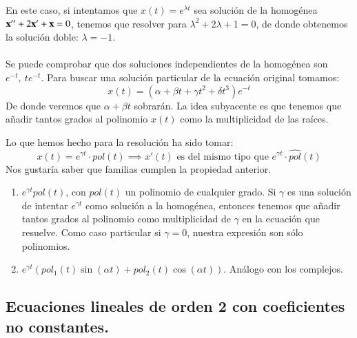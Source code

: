 \begin{eg}[Ecuación lineal de orden 2: $\mbf{x}''+3\mbf{x}'+\mbf{x}=te^{-t}$]
    En este caso, si intentamos que $x(t) = e^{\lambda t}$ sea solución de la homogénea $\mathbf{x}'' + 2\mathbf{x}' + \mathbf{x} = 0$, tenemos que resolver para $\lambda^2 + 2\lambda + 1 = 0$, de donde obtenemos la solución doble: $\lambda = -1$.\\\\
    Se puede comprobar que dos soluciones independientes de la homogénea son $e^{-t},\ te^{-t}$. Para buscar una solución particular de la ecuación original tomamos:
    $$
        x(t) = (\alpha + \beta t + \gamma t^2 + \delta t^3) e^{-t}
    $$
    De donde veremos que $\alpha + \beta t$ sobrarán. La idea subyacente es que tenemos que añadir tantos grados al polinomio $x(t)$ como la multiplicidad de las raíces.
\end{eg}
\begin{obs}
    Lo que hemos hecho para la resolución ha sido tomar:
    $$
        x(t) = e^{\gamma t} \cdot pol(t) \implies x'(t) \text{ es del mismo tipo que } e^{\gamma t} \cdot \hat{pol}(t)
    $$
    Nos gustaría saber que familias cumplen la propiedad anterior.
    \begin{enumerate}
        \item $e^{\gamma t} pol(t)$, con $pol(t)$ un polinomio de cualquier grado. Si $\gamma$ es una solución de intentar $e^{\gamma t}$ como solución a la homogénea, entonces tenemos que añadir tantos grados al polinomio como multiplicidad de $\gamma$ en la ecuación que resuelve. Como caso particular si $\gamma = 0$, nuestra expresión son sólo polinomios.
        \item $e^{\gamma t} (pol_1(t) \sin(\alpha t) + pol_2(t)\cos(\alpha t))$. Análogo con los complejos. %
    \end{enumerate}
\end{obs}
\subsection{Ecuaciones lineales de orden 2 con coeficientes no constantes.}

